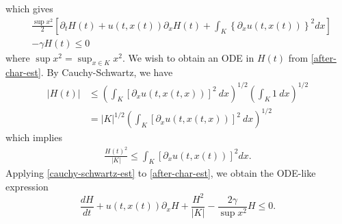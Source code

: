 \documentclass[12pt,reqno]{amsart}
\newcommand{\p}{\partial}
\theoremstyle{plain}  %
\begin{document}
%
%
which gives
\begin{equation}
	\label{after-char-est}
	\begin{split}
		& \frac{\sup x^2}{2} \left [ \p_t H(t) + u(t, x(t)) \p_x H(t) +
		\int_K \left \{\p_x u(t,x(t)) \right \}^2  dx 
		\right ] 		 \\
		& - \gamma H(t) \le 0
	\end{split}
\end{equation}
where $\sup x^2 = \sup_{x \in K} x^2$. We wish to obtain an ODE in $H(t)$ 
from \eqref{after-char-est}. By Cauchy-Schwartz, we have 
%
%
\begin{equation*}
	\begin{split}
		| H(t) |
		& \le \left( \int_K \left[  
		\p_x u(t, x(t,x)) \right]^2 \ dx
		\right)^{1/2} \left( \int_K 1 \ dx \right)^{1/2}
		\\
		& = |K|^{1/2} \left( \int_K \left[  
		\p_x u(t, x(t,x)) \right]^2 \ dx
		\right)^{1/2} 
	\end{split}
\end{equation*}
%
%
which implies
%
%
\begin{equation}
	\label{cauchy-schwartz-est}
	\begin{split}
		\frac{H(t)^2}{|K|} \le \int_K \left[ \p_x u(t, x(t)) \right]^2 dx .
	\end{split}
\end{equation}
%
%
Applying \eqref{cauchy-schwartz-est} to \eqref{after-char-est}, we obtain the ODE-like 
expression
%
%
\begin{equation}
	\label{ode}
	\frac{dH}{dt} + u(t, x(t)) \p_x H + 
	\frac{H^2}{|K|} - \frac{2\gamma}{\sup x^2}H \le 0.
\end{equation}
%
%
%
%
%
%
\end{document}
